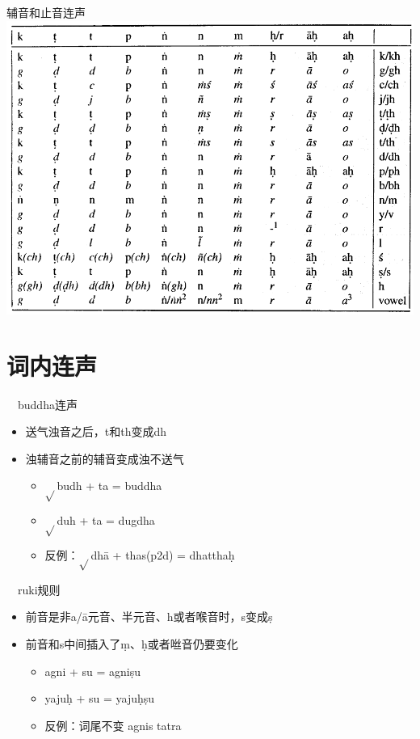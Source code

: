 \documentclass[17pt]{beamer}
\newcommand{\verbroot}[1]{{$\sqrt{#1}$}}
\begin{document}
\begin{frame}{辅音和止音连声}  
  \centering
  \includegraphics[width=\textwidth]{consonantsandhi.png} %
\end{frame}

\section{词内连声}

\begin{frame}{\insertsection ~~buddha连声}
  \begin{itemize}
    \item 送气浊音之后，t和th变成dh
    \item 浊辅音之前的辅音变成浊不送气
    \begin{itemize}
      \item \verbroot{}budh + ta = buddha
      \item \verbroot{}duh + ta = dugdha
      \item 反例：\verbroot{}dhā + thas(p2d) = dhatthaḥ
    \end{itemize}
  \end{itemize}
\end{frame}

\begin{frame}{\insertsection ~~ruki规则}
  \begin{itemize}
    \item 前音是非a/ā元音、半元音、h或者喉音时，s变成ṣ
    \item 前音和s中间插入了ṃ、ḥ或者咝音仍要变化
    \begin{itemize}
      \item agni + su = agniṣu
      \item yajuḥ + su = yajuḥṣu
      \item 反例：词尾不变 agnis tatra 
    \end{itemize}
  \end{itemize}
\end{frame}
\end{document}
